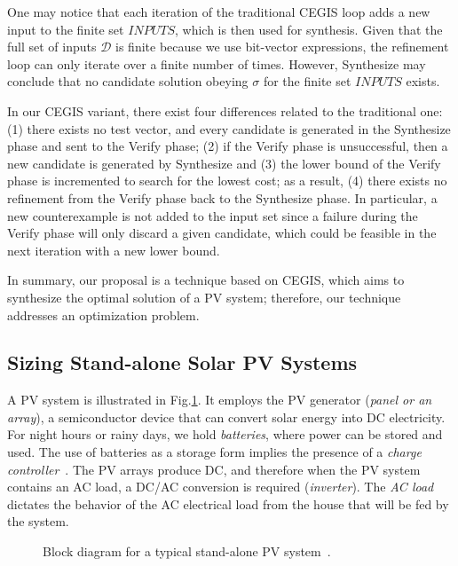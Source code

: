 \documentclass[10pt,journal,compsoc]{IEEEtran}
\begin{document}
One may notice that each iteration of the traditional CEGIS loop adds a new input to the finite set $INPUTS$, which is then used for synthesis. Given that the full set of inputs $\mathcal{D}$ is finite because we use bit-vector expressions, the refinement loop can only iterate over a finite number of times. However, {\sc Synthesize} may conclude that no candidate solution obeying $\sigma$ for the finite set $INPUTS$ exists. 

In our CEGIS variant, there exist four differences related to the traditional one: 
(1) there exists no test vector, and every candidate is generated in the {\sc Synthesize} phase and sent to the {\sc Verify} phase; 
(2) if the {\sc Verify} phase is unsuccessful, then a new candidate is generated by {\sc Synthesize} and 
(3) the lower bound of the {\sc Verify} phase is incremented to search for the lowest cost; as a result,
(4) there exists no refinement from the {\sc Verify} phase back to the {\sc Synthesize} phase. In particular, a new counterexample is not added to the {\sc input} set since a failure during the {\sc Verify} phase will only discard a given candidate, which could be feasible in the next iteration with a new lower bound.

In summary, our proposal is a technique based on CEGIS, which aims to synthesize the optimal solution of a PV system; therefore, our technique addresses an optimization problem.

\subsection{Sizing Stand-alone Solar PV Systems}
\label{sec:sizing}

A PV system is illustrated in Fig.\ref{fig:blockdiagram}. It employs the PV generator (\textit{panel or an array}), a semiconductor device that can convert solar energy into DC electricity. For night hours or rainy days, we hold \textit{batteries}, where power can be stored and used. The use of batteries as a storage form implies the presence of a \textit{charge controller}~\cite{Hansen}. The PV arrays produce DC, and therefore when the PV system contains an AC load, a DC/AC conversion is required (\textit{inverter}). The \textit{AC load} dictates the behavior of the AC electrical load from the house that will be fed by the system.
%
\begin{figure}[h]
\centering
\caption{Block diagram for a typical stand-alone PV system~\cite{Hansen}.}
\label{fig:blockdiagram} 
\end{figure}
\end{document}

